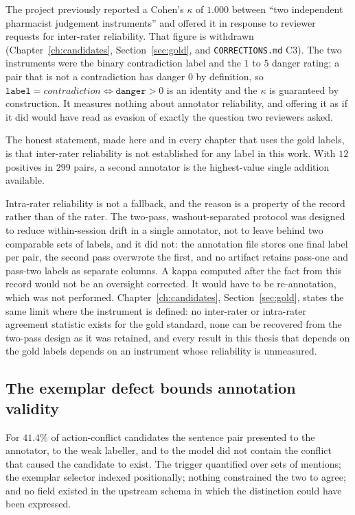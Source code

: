 The project previously reported a Cohen's $\kappa$ of $1.000$ between ``two
independent pharmacist judgement instruments'' and offered it in response to
reviewer requests for inter-rater reliability. That figure is withdrawn
(Chapter~\ref{ch:candidates}, Section~\ref{sec:gold}, and
\texttt{CORRECTIONS.md} C3). The two instruments were the binary contradiction
label and the $1$ to $5$ danger rating; a pair that is not a contradiction has
danger $0$ by definition, so
$\texttt{label} = \textit{contradiction} \iff \texttt{danger} > 0$ is an
identity and the $\kappa$ is guaranteed by construction. It measures nothing
about annotator reliability, and offering it as if it did would have read as
evasion of exactly the question two reviewers asked.

The honest statement, made here and in every chapter that uses the gold labels,
is that inter-rater reliability is not established for any label in this work.
With $12$ positives in $299$ pairs, a second annotator is the highest-value
single addition available.

Intra-rater reliability is not a fallback, and the reason is a property of the
record rather than of the rater. The two-pass, washout-separated protocol was
designed to reduce within-session drift in a single annotator, not to leave
behind two comparable sets of labels, and it did not: the annotation file
stores one final label per pair, the second pass overwrote the first, and no
artifact retains pass-one and pass-two labels as separate columns. A kappa
computed after the fact from this record would not be an oversight corrected.
It would have to be re-annotation, which was not performed. Chapter~\ref{ch:candidates},
Section~\ref{sec:gold}, states the same limit where the instrument is defined:
no inter-rater or intra-rater agreement statistic exists for the gold standard,
none can be recovered from the two-pass design as it was retained, and every
result in this thesis that depends on the gold labels depends on an instrument
whose reliability is unmeasured.

\subsection{The exemplar defect bounds annotation validity}

For $41.4\%$ of action-conflict candidates the sentence pair presented to the
annotator, to the weak labeller, and to the model did not contain the conflict
that caused the candidate to exist. The trigger quantified over sets of
mentions; the exemplar selector indexed positionally; nothing constrained the
two to agree; and no field existed in the upstream schema in which the
distinction could have been expressed.

